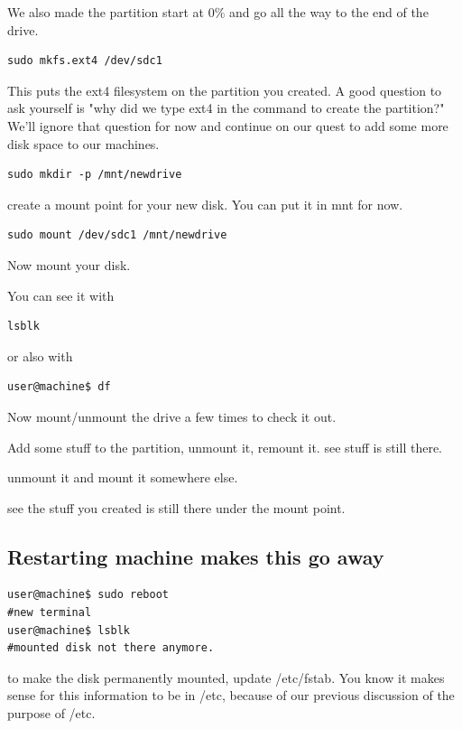 \documentclass[10pt]{article}
\begin{document}
We also made the partition start at 0\% and go all the way to the end of the
drive.

\begin{lstlisting}
sudo mkfs.ext4 /dev/sdc1 
\end{lstlisting}

This puts the ext4 filesystem on the partition you created. A good question to
ask yourself is "why did we type ext4 in the command to create the partition?"
We'll ignore that question for now and continue on our quest to add some more
disk space to our machines.

\begin{lstlisting}
sudo mkdir -p /mnt/newdrive
\end{lstlisting}

create a mount point for your new disk. You can put it in mnt for now.

\begin{lstlisting}
sudo mount /dev/sdc1 /mnt/newdrive
\end{lstlisting}

Now mount your disk. 

You can see it with 

\begin{lstlisting}
lsblk
\end{lstlisting}

or also with

\begin{lstlisting}
user@machine$ df
\end{lstlisting}

Now mount/unmount the drive a few times to check it out.

Add some stuff to the partition, unmount it, remount it. see stuff is still
there.

unmount it and mount it somewhere else. 

see the stuff you created is still there under the mount point.

\subsection{Restarting machine makes this go away}

\begin{lstlisting}
user@machine$ sudo reboot
#new terminal
user@machine$ lsblk
#mounted disk not there anymore. 
\end{lstlisting}

to make the disk permanently mounted, update /etc/fstab. You know it makes sense
for this information to be in /etc, because of our previous discussion of the
purpose of /etc.
\end{document}
